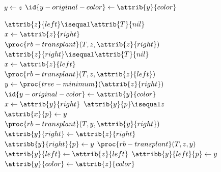 \documentclass[a4paper,12pt]{article}
\begin{document}
\begin{figure}[ht]
  \begin{minipage}[b]{0.45\linewidth}
  \centering
  \begin{codebox}
    \li    $y \gets z$
    \li    $\id{y-original-color} \gets \attrib{y}{color}$
    
    \li    \If $ \attrib{z}{left} \isequal \attrib{T}{nil} $
    \li        \Then  $ x  \gets \attrib{z}{right}$
    \li               $ \proc{rb-transplant}(T,z,\attrib{z}{right}) $
    \li    \ElseIf    $\attrib{z}{right} \isequal \attrib{T}{nil} $
    \li        \Then  $ x  \gets \attrib{z}{left} $
    \li               $ \proc{rb-transplant}(T,z,\attrib{z}{left}) $
    \li    \Else  $ y \gets \proc{tree-minimum}(\attrib{z}{right}) $
    \li           $ \id{y-original-color} \gets \attrib{y}{color} $  			  
    \li           $ x \gets \attrib{y}{right} $       
    \li           \If $ \attrib{y}{p} \isequal  z $		
    \li             \Then $ \attrib{x}{p}\gets y $
    \li           \Else  $ \proc{rb-transplant}(T,y,\attrib{y}{right}) $ 
    \li                  $ \attrib{y}{right} \gets \attrib{z}{right} $
    \li                  $ \attribb{y}{right}{p} \gets y $ 
    \End
    \li           $ \proc{rb-transplant}(T,z,y) $ 
    \li           $ \attrib{y}{left} \gets \attrib{z}{left} $ 
    \li           $ \attribb{y}{left}{p} \gets y $ 
    \li           $ \attrib{y}{color} \gets \attrib{z}{color} $ 
    \End
    

\end{codebox}
\end{minipage}
\end{figure}
\end{document}
